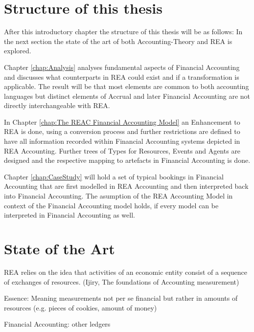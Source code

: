 \section{Structure of this thesis}
After this introductory chapter the structure of this thesis will be as follows:
In the next section the state of the art of both Accounting-Theory and REA is
explored.

Chapter \ref{chap:Analysis} analyses fundamental aspects of Financial Accounting
and discusses what counterparts in REA could exist and if a transformation is
applicable.
The result will be that most elements are common to both accounting languages
but distinct elements of Accrual and later Financial Accounting are not directly
interchangeable with REA.

In Chapter \ref{chap:The REAC Financial Accounting Model} an Enhancement to REA is done, using a conversion process and further restrictions are defined to have all information recorded within 
Financial Accounting systems depicted in REA Accounting.
Further trees of Types for Resources, Events and Agents are designed and the respective mapping to artefacts in Financial Accounting is done. 


Chapter \ref{chap:CaseStudy} will hold a set of typical bookings in Financial Accounting that are first modelled in REA Accounting and then interpreted back into Financial Accounting.
The asumption of the REA Accounting Model in context of the Financial Accounting model holds, if every model can be interpreted in Financial Accounting as well.


% 	
\section{State of the Art}
REA relies on the idea that activities of an economic entity consist of a sequence of exchanges of resources. (Ijiry, The foundations of Accounting measurement)

Essence: Meaning measurements not per se financial but rather in amounts of
resources (e.g. pieces of cookies, amount of money)

Financial Accounting: other ledgers
